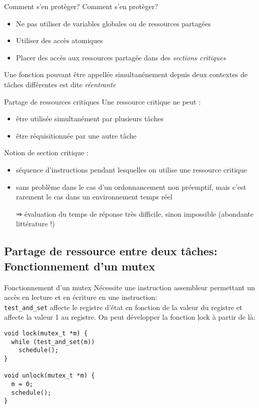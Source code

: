 \begin{frame}{Comment s'en protèger?}
  Comment s'en protèger?
  \begin{itemize}
  \item  Ne  pas  utiliser  de  variables globales  ou  de  ressources
    partagées
  \item Utiliser des accès atomiques
  \item   Placer  des   accès   aux  ressources   partagée  dans   des
    \emph{sections critiques}
  \end{itemize}
  Une  fonction  pouvant  être  appellée simultanénement  depuis  deux
  contextes de tâches différentes est dite \emph{réentrante}
\end{frame}

\begin{frame}{Partage de ressources critiques}
  Une ressource critique ne peut :
  \begin{itemize}
  \item être utilisée simultanément par plusieurs tâches
  \item être réquisitionnée par une autre tâche
  \end{itemize}
  Notion de section critique :
  \begin{itemize}
  \item  séquence  d'instructions pendant  lesquelles  on utilise  une
    ressource critique
  \item sans  problème dans le cas d'un  ordonnancement non préemptif,
    mais  c'est rarement  le cas  dans un  environnement temps  réel
  \item[⇒]  évaluation  du  temps  de réponse  très  difficile,  sinon
    impossible (abondante littérature !)
  \end{itemize}
\end{frame}

\subsection{Partage de ressource entre deux tâches: Fonctionnement d'un mutex}

\begin{frame}[fragile]{Fonctionnement d'un mutex}
  Nécessite une instruction assembleur  permettant un accès en lecture
  et en écriture  en une instruction: \\
  \texttt{test\_and\_set} affecte le registre d'état en fonction de la
  valeur  du registre  et affecte  la valeur  1 au  registre.  On peut
  développer la fonction \c{lock} à partir de là:
  \begin{lstlisting}
void lock(mutex_t *m) {
  while (test_and_set(m))
    schedule();
}

void unlock(mutex_t *m) {
  m = 0;
  schedule();
}
  \end{lstlisting}
\end{frame}

